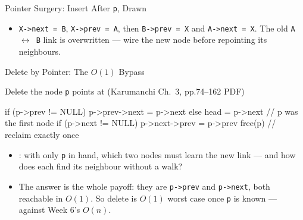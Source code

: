 \documentclass[aspectratio=169]{beamer}
\begin{document}
\begin{frame}{Pointer Surgery: Insert After \texttt{p}, Drawn}
  \begin{center}
  \end{center}
  \vspace{-0.2cm}
  \begin{itemize}
    \item \texttt{X->next = B}, \texttt{X->prev = A}, then
      \texttt{B->prev = X} and \texttt{A->next = X}. The old
      \texttt{A $\leftrightarrow$ B} link is overwritten --- wire the new node
      before repointing its neighbours.
  \end{itemize}
\end{frame}

\begin{frame}[fragile]{Delete by Pointer: The $O(1)$ Bypass}
  \begin{block}{Delete the node \texttt{p} points at (Karumanchi Ch.~3,
    pp.74--162 PDF)}
\begin{semiverbatim}
if (p->prev != NULL) p->prev->next = p->next
else head = p->next                 // p was the first node
if (p->next != NULL) p->next->prev = p->prev
free(p)                             // reclaim exactly once
\end{semiverbatim}
  \end{block}
  \begin{itemize}
    \item {}: with only \texttt{p} in hand, which two nodes
      must learn the new link --- and how does each find its neighbour without
      a walk?
    \item The answer is the whole payoff: they are \texttt{p->prev} and
      \texttt{p->next}, both reachable in $O(1)$. So delete is $O(1)$ worst
      case once \texttt{p} is known --- against Week 6's $O(n)$.
  \end{itemize}
\end{frame}
\end{document}
